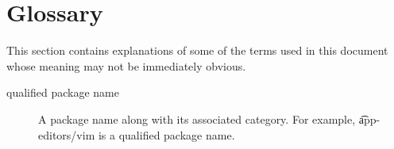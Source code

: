 \chapter{Glossary}
\label{glossary}

This section contains explanations of some of the terms used in this document whose meaning may not
be immediately obvious.

\begin{description}
\item[qualified package name] A package name along with its associated category. For example,
    \t{app-editors/vim} is a qualified package name.

\end{description}


